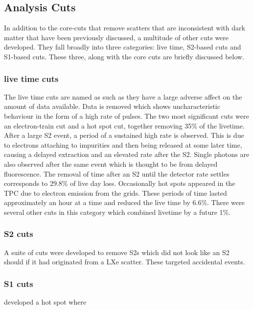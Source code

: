 \subsection{Analysis Cuts}
\par
In addition to the core-cuts that remove scatters that are inconsistent with dark matter that have been previously discussed, a multitude of other cuts were developed.
They fall broadly into three categories: live time, S2-based cuts and S1-based cuts.
These three, along with the core cuts are briefly discussed below.


\subsubsection{live time cuts}
The live time cuts are named as such as they have a large adverse affect on the amount of data available.
Data is removed which shows uncharacteristic behaviour in the form of a high rate of pulses.
The two most significant cuts were an electron-train cut and a hot spot cut, together removing 35\% of the livetime.
After a large S2 event, a period of a sustained high rate is observed. 
This is due to electrons attaching to impurities and then being released at some later time, causing a delayed extraction and an elevated rate after the S2.
Single photons are also observed after the same event which is thought to be from delayed fluorescence.
The removal of time after an S2 until the detector rate settles corresponds to 29.8\% of live day loss.
Occasionally hot spots appeared in the TPC due to electron emission from the grids. 
These periods of time lasted approximately an hour at a time and reduced the live time by 6.6\%.
There were several other cuts in this category which combined livetime by a future 1\%.

\subsubsection{S2 cuts}
A suite of cuts were developed to remove S2s which did not look like an S2 should if it had originated from a LXe scatter.
These targeted accidental events.

\subsubsection{S1 cuts}


developed a hot spot where 

